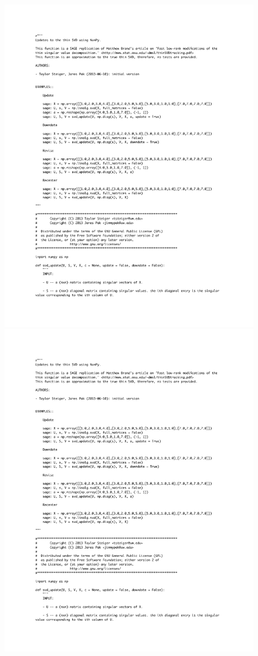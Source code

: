 \documentclass{article}
\begin{document}
\begin{figure}[ht!]
  \begin{center}
    \includegraphics[page=1, bb=0.0in 0.0in 8.5in 10in, scale=.5]{half1.pdf}
    \includegraphics[page=2, bb=0.0in 0.0in 8.5in 9in, scale=.5]{half1.pdf}

\end{center}
\end{figure}
\end{document}
